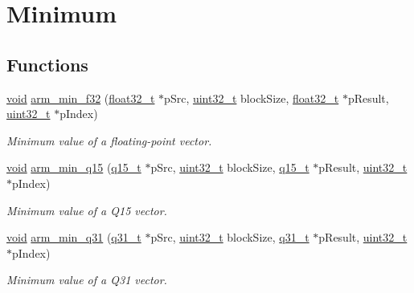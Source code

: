 \hypertarget{group___min}{\section{Minimum}
\label{group___min}
}
\subsection*{Functions}
\begin{DoxyCompactItemize}
\item 
\hyperlink{group___n_a_m_e_ga18028b8badbf1ea7e704ccac3c488e82}{void} \hyperlink{group___min_gaf62b1673740fc516ea64daf777b7d74a}{arm\-\_\-min\-\_\-f32} (\hyperlink{arm__math_8h_a4611b605e45ab401f02cab15c5e38715}{float32\-\_\-t} $\ast$p\-Src, \hyperlink{stdint_8h_a435d1572bf3f880d55459d9805097f62}{uint32\-\_\-t} block\-Size, \hyperlink{arm__math_8h_a4611b605e45ab401f02cab15c5e38715}{float32\-\_\-t} $\ast$p\-Result, \hyperlink{stdint_8h_a435d1572bf3f880d55459d9805097f62}{uint32\-\_\-t} $\ast$p\-Index)
\begin{DoxyCompactList}\small\item\em Minimum value of a floating-\/point vector. \end{DoxyCompactList}\item 
\hyperlink{group___n_a_m_e_ga18028b8badbf1ea7e704ccac3c488e82}{void} \hyperlink{group___min_gad065e37535ebb726750ac1545cb3fa6f}{arm\-\_\-min\-\_\-q15} (\hyperlink{arm__math_8h_ab5a8fb21a5b3b983d5f54f31614052ea}{q15\-\_\-t} $\ast$p\-Src, \hyperlink{stdint_8h_a435d1572bf3f880d55459d9805097f62}{uint32\-\_\-t} block\-Size, \hyperlink{arm__math_8h_ab5a8fb21a5b3b983d5f54f31614052ea}{q15\-\_\-t} $\ast$p\-Result, \hyperlink{stdint_8h_a435d1572bf3f880d55459d9805097f62}{uint32\-\_\-t} $\ast$p\-Index)
\begin{DoxyCompactList}\small\item\em Minimum value of a Q15 vector. \end{DoxyCompactList}\item 
\hyperlink{group___n_a_m_e_ga18028b8badbf1ea7e704ccac3c488e82}{void} \hyperlink{group___min_gab20faeceb5ff5d2d9dd628c2ecf41303}{arm\-\_\-min\-\_\-q31} (\hyperlink{arm__math_8h_adc89a3547f5324b7b3b95adec3806bc0}{q31\-\_\-t} $\ast$p\-Src, \hyperlink{stdint_8h_a435d1572bf3f880d55459d9805097f62}{uint32\-\_\-t} block\-Size, \hyperlink{arm__math_8h_adc89a3547f5324b7b3b95adec3806bc0}{q31\-\_\-t} $\ast$p\-Result, \hyperlink{stdint_8h_a435d1572bf3f880d55459d9805097f62}{uint32\-\_\-t} $\ast$p\-Index)
\begin{DoxyCompactList}\small\item\em Minimum value of a Q31 vector. \end{DoxyCompactList}\item 

\end{DoxyCompactItemize}
